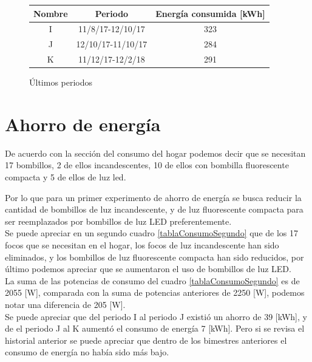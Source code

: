 \documentclass[]{article}
\begin{document}
\begin{figure}[h!]
	\centering
	\begin{tabular}[]{|c|c|c|}
		\hline
		Nombre & Periodo & Energía consumida [kWh]\\
		\hline
	I & 11/8/17-12/10/17 & 323 \\
	
	J & 12/10/17-11/10/17 & 284 \\
		K & 11/12/17-12/2/18 & 291 \\
	
		\hline
	\end{tabular}
	\label{cuadro:ultimosPeriodos}
	\caption{Últimos periodos}
	
\end{figure}

\section{Ahorro de energía}

De acuerdo con la sección del consumo del hogar podemos decir que se necesitan 17 bombillos, 2 de ellos incandescentes, 10 de ellos con bombilla fluorescente compacta y 5 de ellos de luz led.

Por lo que para un primer experimento de ahorro de energía se busca reducir la cantidad de bombillos de luz incandescente, y de luz fluorescente compacta para ser reemplazados por bombillos de luz LED preferentemente.\\

Se puede apreciar en un segundo cuadro \ref{tablaConsumoSegundo} que de los 17 focos que se necesitan en el hogar, los focos de luz incandescente han sido eliminados, y los bombillos de luz fluorescente compacta han sido reducidos, por último podemos apreciar que se aumentaron el uso de bombillos de luz LED.\\

La suma de las potencias de consumo del cuadro \ref{tablaConsumoSegundo} es de 2055 [W], comparada con la suma de potencias anteriores de 2250 [W], podemos notar una diferencia de 205 [W].\\

Se puede apreciar que del periodo I al periodo J existió un ahorro de 39 [kWh], y de el periodo J al K aumentó el consumo de energía 7 [kWh]. Pero si se revisa el historial anterior se puede apreciar que dentro de los bimestres anteriores el consumo de energía no había sido más bajo.\\
\end{document}
